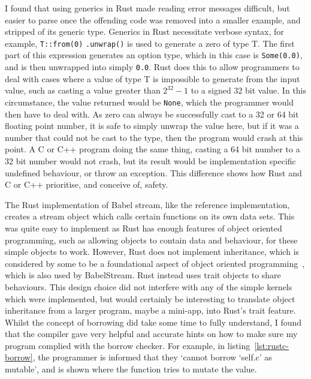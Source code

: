 I found that using generics in Rust made reading error messages difficult, but easier to parse once the offending code was removed into a smaller example, and stripped of its generic type. Generics in Rust necessitate verbose syntax, for example, \texttt{T::from(0)} \texttt{.unwrap()} is used to generate a zero of type T. 
The first part of this expression generates an option type, which in this case is \texttt{Some(0.0)}, and is then unwrapped into simply \texttt{0.0}. Rust does this to allow programmers to deal with cases where a value of type T is impossible to generate from the input value, such as casting a value greater than $2^{32} - 1$ to a signed 32 bit value.
In this circumstance, the value returned would be \texttt{None}, which the programmer would then have to deal with. As zero can always be successfully cast to a 32 or 64 bit floating point number, it is safe to simply unwrap the value here, but if it was a number that could not be cast to the type, then the program would crash at this point. A C or C++ program doing the same thing, casting a 64 bit number to a 32 bit number would not crash, but its result would be implementation specific undefined behaviour, or throw an exception. This difference shows how Rust and C or C++ prioritise, and conceive of, safety.

The Rust implementation of Babel stream, like the reference implementation, creates a stream object which calls certain functions on its own data sets. This was quite easy to implement as Rust has enough features of object oriented programming, such as allowing objects to contain data and behaviour, for these simple objects to work.
However, Rust does not implement inheritance, which is considered by some to be a foundational aspect of object oriented programming~\cite{Liskov:1987}, which is also used by BabelStream. Rust instead uses trait objects to share behaviours. This design choice did not interfere with any of the simple kernels which were implemented, but would certainly be interesting to translate object inheritance from a larger program, maybe a mini-app, into Rust's trait feature.
Whilst the concept of borrowing did take some time to fully understand, I found that the compiler gave very helpful and accurate hints on how to make sure my program complied with the borrow checker. For example, in listing~\ref{lst:rustc-borrow}, the programmer is informed that they `cannot borrow `self.c' as mutable', and is shown where the function tries to mutate the value. 

